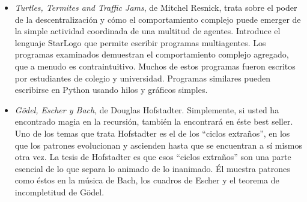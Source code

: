 \begin{itemize}
\item {\em Turtles, Termites and Traffic Jams}, de Mitchel Resnick,
trata sobre el poder de la descentralización y cómo el comportamiento
complejo puede emerger de la simple actividad coordinada de una multitud
de agentes. Introduce el lenguaje StarLogo que permite escribir
programas multiagentes. Los programas examinados demuestran el
comportamiento complejo agregado, que a menudo es contraintuitivo. 
Muchos de estos programas fueron escritos por estudiantes de colegio
y universidad. Programas similares pueden escribirse en Python
usando hilos y gráficos simples.

\item {\em G\"{o}del, Escher y Bach}, de Douglas Hofstadter.  Simplemente,
si usted ha encontrado magia en la recursión, también la encontrará en éste
best seller. Uno de los temas que trata Hofstadter es el de los 
 ``ciclos extraños'', en los que los patrones evolucionan y ascienden hasta
que se encuentran a sí mismos otra vez. La tesis de Hofstadter es que 
esos ``ciclos extraños'' son una parte esencial de lo que separa lo 
animado de lo inanimado. Él muestra patrones como éstos en la 
música de Bach, los cuadros de Escher y el teorema de incompletitud de
 Gödel.

\end{itemize}
